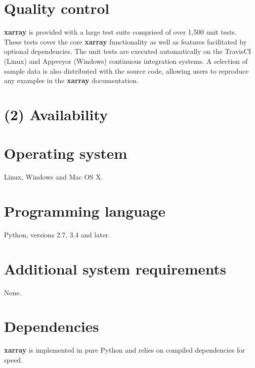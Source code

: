\documentclass{jors}
\begin{document}
\section*{Quality control}

\textbf{xarray} is provided with a large test suite comprised of over 1,500 unit tests.
These tests cover the core \textbf{xarray} functionality as well as features facilitated by optional dependencies.
The unit tests are executed automatically on the TravisCI (Linux) \citep{TravisCI} and Appveyor (Windows) \citep{Appveyor} continuous integration systems.
A selection of sample data is also distributed with the source code, allowing users to reproduce any examples in the \textbf{xarray} documentation.

\section*{(2) Availability}
\vspace{0.5cm}
\section*{Operating system}

Linux, Windows and Mac OS X.

\section*{Programming language}

Python, versions 2.7, 3.4 and later.

\section*{Additional system requirements}

None.

\section*{Dependencies}

\textbf{xarray} is implemented in pure Python and relies on compiled dependencies for
speed.
\end{document}

